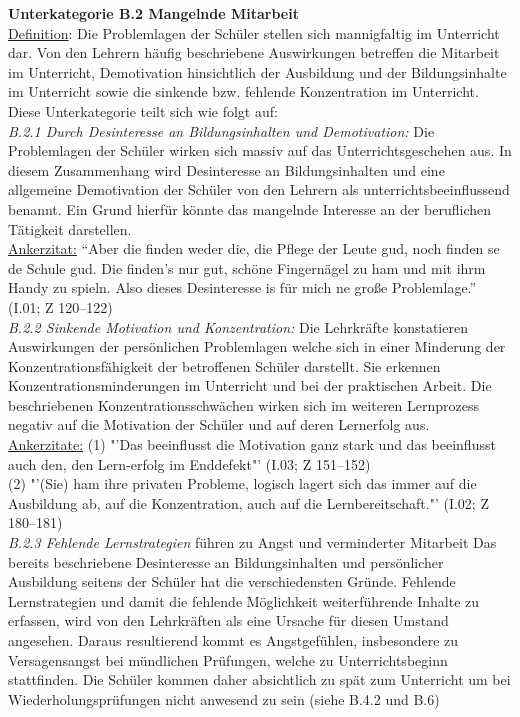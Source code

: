 \noindent
\textbf{Unterkategorie B.2 Mangelnde Mitarbeit}\\
\underline{Definition}: Die Problemlagen der Schüler stellen sich mannigfaltig im Unterricht dar. Von den Lehrern häufig beschriebene Auswirkungen betreffen die Mitarbeit im Unterricht, Demotivation hinsichtlich der Ausbildung und der Bildungsinhalte im Unterricht sowie die sinkende bzw. fehlende Konzentration im Unterricht. Diese Unterkategorie teilt sich wie folgt auf:\\
\textit{B.2.1 Durch Desinteresse an Bildungsinhalten und Demotivation:} Die Problemlagen der Schüler wirken sich massiv auf das Unterrichtsgeschehen aus. In diesem Zusammenhang wird Desinteresse an Bildungsinhalten und eine allgemeine Demotivation der Schüler von den Lehrern als unterrichtsbeeinflussend benannt. Ein Grund hierfür könnte das mangelnde Interesse an der beruflichen Tätigkeit darstellen.\\
\underline{Ankerzitat:} "`Aber die finden weder die, die Pflege der Leute gud, noch finden se de Schule gud. Die finden's nur gut, schöne Fingernägel zu ham und mit ihrm Handy zu spieln. Also dieses Desinteresse is für mich ne große Problemlage."' (I.01; Z 120--122)\\
\textit{B.2.2  Sinkende Motivation und Konzentration:} Die Lehrkräfte konstatieren Auswirkungen der persönlichen Problemlagen welche sich in einer Minderung der Konzentrationsfähigkeit der betroffenen Schüler darstellt. Sie erkennen Konzentrationsminderungen im Unterricht und bei der praktischen Arbeit. Die beschriebenen Konzentrationsschwächen wirken sich im weiteren Lernprozess negativ auf die Motivation der Schüler und auf deren Lernerfolg aus.\\
\underline{Ankerzitate:} (1) "'Das beeinflusst die Motivation ganz stark und das beeinflusst auch den, den Lern-erfolg im Enddefekt"' (I.03; Z 151--152)\\ (2) "'(Sie) ham ihre privaten Probleme, logisch lagert sich das immer auf die Ausbildung ab, auf die Konzentration, auch auf die Lernbereitschaft."' (I.02; Z 180--181)\\
\textit{B.2.3 Fehlende Lernstrategien} führen zu Angst und verminderter Mitarbeit Das bereits beschriebene Desinteresse an Bildungsinhalten und persönlicher Ausbildung seitens der Schüler hat die verschiedensten Gründe. Fehlende Lernstrategien und damit die fehlende Möglichkeit weiterführende Inhalte zu erfassen, wird von den Lehrkräften als eine Ursache für diesen Umstand angesehen. Daraus resultierend kommt es Angstgefühlen, insbesondere zu Versagensangst bei mündlichen Prüfungen, welche zu Unterrichtsbeginn stattfinden. Die Schüler kommen daher absichtlich zu spät zum Unterricht um bei Wiederholungsprüfungen nicht anwesend zu sein (siehe B.4.2 und B.6)\\

